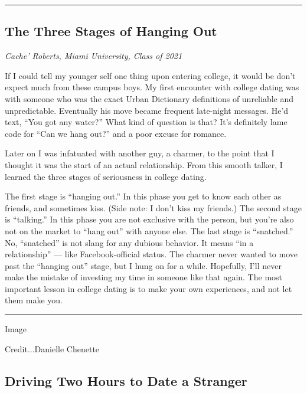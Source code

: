 \begin{center}\rule{0.5\linewidth}{\linethickness}\end{center}

\hypertarget{the-three-stages-of-hanging-out}{%
\subsection{The Three Stages of Hanging
Out}\label{the-three-stages-of-hanging-out}}

\emph{Cache' Roberts, Miami University, Class of 2021}

If I could tell my younger self one thing upon entering college, it
would be don't expect much from these campus boys. My first encounter
with college dating was with someone who was the exact Urban Dictionary
definitions of unreliable and unpredictable. Eventually his move became
frequent late-night messages. He'd text, ``You got any water?'' What
kind of question is that? It's definitely lame code for ``Can we hang
out?'' and a poor excuse for romance.

Later on I was infatuated with another guy, a charmer, to the point that
I thought it was the start of an actual relationship. From this smooth
talker, I learned the three stages of seriousness in college dating.

The first stage is ``hanging out.'' In this phase you get to know each
other as friends, and sometimes kiss. (Side note: I don't kiss my
friends.) The second stage is ``talking.'' In this phase you are not
exclusive with the person, but you're also not on the market to ``hang
out'' with anyone else. The last stage is ``snatched.'' No, ``snatched''
is not slang for any dubious behavior. It means ``in a relationship''
--- like Facebook-official status. The charmer never wanted to move past
the ``hanging out'' stage, but I hung on for a while. Hopefully, I'll
never make the mistake of investing my time in someone like that again.
The most important lesson in college dating is to make your own
experiences, and not let them make you.

\begin{center}\rule{0.5\linewidth}{\linethickness}\end{center}

Image

Credit...Danielle Chenette

\hypertarget{driving-two-hours-to-date-a-stranger}{%
\subsection{Driving Two Hours to Date a
Stranger}\label{driving-two-hours-to-date-a-stranger}}

